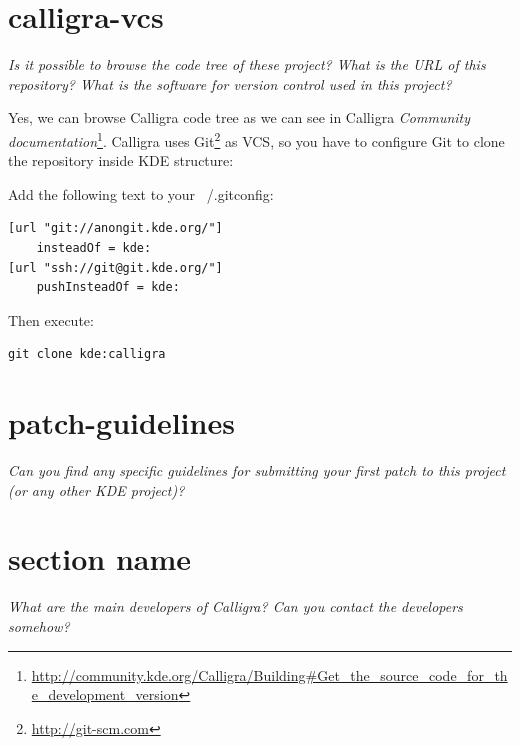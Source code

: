 \documentclass[11pt]{scrartcl}
\begin{document}
\section{calligra-vcs}
\label{sec:q-01}

\emph{Is it possible to browse the code tree of these project? What is the URL of this repository? What is the software for version control used in this project?}

\par Yes, we can browse Calligra code tree as we can see in Calligra \emph{Community documentation}\footnote{\url{http://community.kde.org/Calligra/Building\#Get_the_source_code_for_the_development_version}}. Calligra uses Git\footnote{\url{http://git-scm.com}} as VCS, so you have to configure Git to clone the repository inside KDE structure:

Add the following text to your ~/.gitconfig:
\begin{Verbatim}[frame=single]
[url "git://anongit.kde.org/"]
    insteadOf = kde:
[url "ssh://git@git.kde.org/"]
    pushInsteadOf = kde:
\end{Verbatim}

Then execute:
\begin{Verbatim}[frame=single]
 git clone kde:calligra
\end{Verbatim}

\section{patch-guidelines}
\label{sec:q-02}

\emph{Can you find any specific guidelines for submitting your first patch to this project (or any other KDE project)?}



\section{section name}
\label{sec:}


\emph{What are the main developers of Calligra? Can you contact the developers somehow?}

\end{document}
